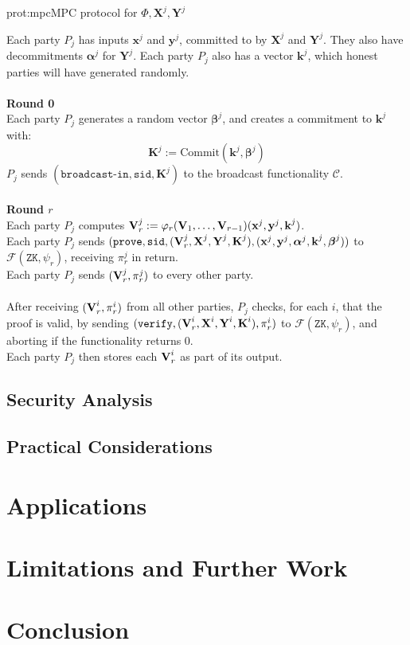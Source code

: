 \begin{aprotocol}{prot:mpc}{MPC protocol for $\Phi, \textbf{X}^j, \textbf{Y}^j$}

Each party $P_j$ has inputs $\textbf{x}^j$ and $\textbf{y}^j$, committed to
by $\textbf{X}^j$ and $\textbf{Y}^j$.
They also have decommitments $\boldsymbol{\alpha}^j$ for $\textbf{Y}^j$.
Each party $P_j$ also has a vector $\textbf{k}^j$, which honest parties will
have generated randomly.\\
\\
\textbf{Round 0}\\
Each party $P_j$ generates a random vector $\boldsymbol{\beta}^j$, and creates
a commitment to $\textbf{k}^j$ with:
$$
\textbf{K}^j := \text{Commit}(\textbf{k}^j, \boldsymbol{\beta}^j)
$$
$P_j$ sends $(\texttt{broadcast-in}, \texttt{sid}, \textbf{K}^j)$ to
the broadcast functionality $\mathcal{C}$.\\
\\
\textbf{Round $r$}\\
Each party $P_j$ computes $\textbf{V}^j_r := \varphi_r(\textbf{V}_1, \ldots, \textbf{V}_{r - 1})(\textbf{x}^j, \textbf{y}^j, \textbf{k}^j)$.\\
Each party $P_j$ sends $(\texttt{prove}, \texttt{sid}, (\textbf{V}^j_r, \textbf{X}^j, \textbf{Y}^j, \textbf{K}^j), (\textbf{x}^j, \textbf{y}^j, \boldsymbol{\alpha}^j, \textbf{k}^j, \boldsymbol{\beta}^j))$
to $\mathcal{F}(\texttt{ZK}, \psi_r)$, receiving $\pi^j_r$ in return.\\
Each party $P_j$ sends $(\textbf{V}^j_r, \pi^j_r)$ to every other party.\\
\\
After receiving $(\textbf{V}^i_r, \pi^i_r)$  from all other parties, $P_j$ checks,
for each $i$, that the proof is valid, by sending $(\texttt{verify}, (\textbf{V}^i_r, \textbf{X}^i, \textbf{Y}^i, \textbf{K}^i), \pi^i_r)$ to
$\mathcal{F}(\texttt{ZK}, \psi_r)$, and aborting if the functionality returns $0$.\\
Each party $P_j$ then stores each $\textbf{V}^i_r$ as part of its output.
\end{aprotocol}


\subsection{Security Analysis}

\subsection{Practical Considerations}

\section{Applications}

\section{Limitations and Further Work}

\section{Conclusion}


\small 

